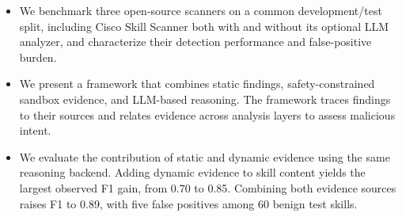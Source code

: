 \begin{itemize}
    \item We benchmark three open-source scanners on a common
    development/test split, including Cisco Skill Scanner both
    with and without its optional LLM analyzer, and characterize
    their detection performance and false-positive burden.



    \item We present a framework that combines static findings,
    safety-constrained sandbox evidence, and LLM-based reasoning.
    The framework traces findings to their sources and relates
    evidence across analysis layers to assess malicious intent.

    \item We evaluate the contribution of static and dynamic evidence
    using the same reasoning backend. Adding dynamic evidence to
    skill content yields the largest observed F1 gain, from 0.70
    to 0.85. Combining both evidence sources raises F1 to 0.89,
    with five false positives among 60 benign test skills.
\end{itemize}




 


